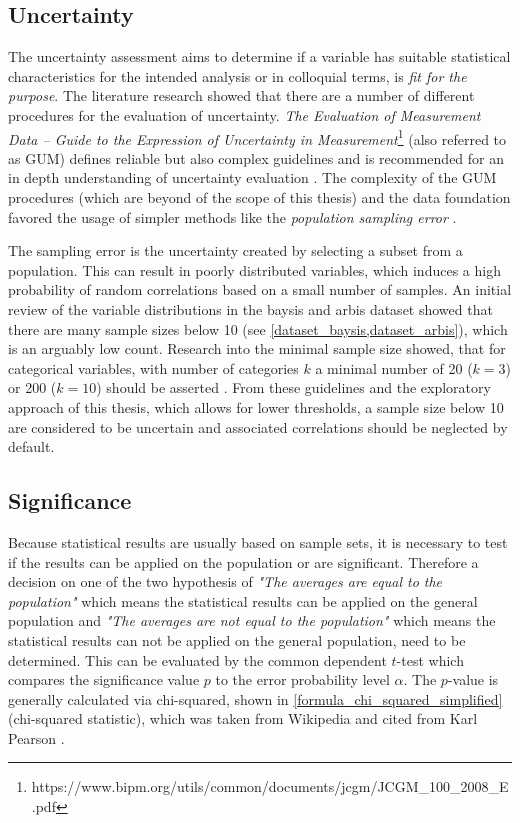 \subsection{Uncertainty}
\label{correlation_uncertainty}
The uncertainty assessment aims to determine if a variable has suitable statistical characteristics for the intended analysis or in colloquial terms, is \textit{fit for the purpose}. The literature research showed that there are a number of different procedures for the evaluation of uncertainty. \textit{The Evaluation of Measurement Data -- Guide to the Expression of Uncertainty in Measurement}\footnote{https://www.bipm.org/utils/common/documents/jcgm/JCGM\_100\_2008\_E.pdf} (also referred to as GUM) defines reliable but also complex guidelines and is recommended for an in depth understanding of uncertainty evaluation \parencite{Farrance2012}. The complexity of the GUM procedures (which are beyond of the scope of this thesis) and the data foundation favored the usage of simpler methods like the \textit{population sampling error} \parencite{ONS2020}.

The sampling error is the uncertainty created by selecting a subset from a population. This can result in poorly distributed variables, which induces a high probability of random correlations based on a small number of samples. An initial review of the variable distributions in the \acrshort{baysis} and \acrshort{arbis} dataset showed that there are many sample sizes below 10 (see \cref{dataset_baysis,dataset_arbis}), which is an arguably low count. Research into the minimal sample size showed, that for categorical variables, with number of categories $k$ a minimal number of 20 ($k=3$) or 200 ($k=10$) should be asserted \parencite{Cicchetti1981}. From these guidelines and the exploratory approach of this thesis, which allows for lower thresholds, a sample size below 10 are considered to be uncertain and associated correlations should be neglected by default.

\subsection{Significance}
\label{correlation_significance}
Because statistical results are usually based on sample sets, it is necessary to test if the results can be applied on the population or are significant. Therefore a decision on one of the two hypothesis of \textit{"The averages are equal to the population"} which means the statistical results can be applied on the general population and \textit{"The averages are not equal to the population"} which means the statistical results can not be applied on the general population, need to be determined. This can be evaluated by the common dependent $t$-test which compares the significance value $p$ to the error probability level $\alpha$. The $p$-value is generally calculated via chi-squared, shown in \cref{formula_chi_squared_simplified} (chi-squared statistic), which was taken from Wikipedia and cited from Karl Pearson \parencite{Pearson1990}.

